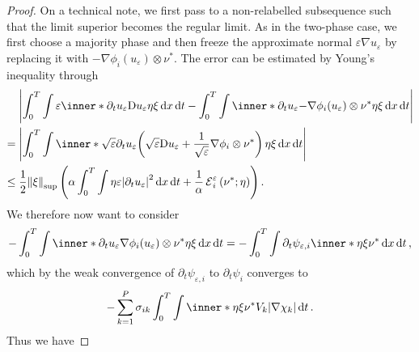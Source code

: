 \begin{proof}
	On a technical note, we first pass to a non-relabelled subsequence such 
	that the limit superior becomes the regular limit.
	As in the two-phase case, we first choose a majority phase and then freeze 
	the approximate normal $ \varepsilon \nabla u_{ \varepsilon } $ by 
	replacing it with $ - \nabla \phi_{ i } ( u_{ \varepsilon } ) \otimes \nu^{ 
	\ast } $. The error can be estimated by Young's inequality through
	\begin{align}
		\notag
		& \abs{
			\int_{ 0 }^{ T }
			\int
			\varepsilon
			\inner*{ \partial_{  t } u_{ 
					\varepsilon } }{ \diff u_{ \varepsilon } \eta \xi }
			\dd{ x }
			\dd{ t }
			-
			\int_{ 0 }^{ T }
			\int
			\inner*{ \partial_{ t } u_{ \varepsilon } }{ - \nabla \phi_{ 
					i } ( u_{ \varepsilon } ) \otimes 
				\nu^{ \ast } \eta\xi }
			\dd{ x }
			\dd{ t }
		}
		\\
		\notag
		={} &
		\abs{
			\int_{ 0 }^{ T }
			\int
			\inner*
			{ 
				\sqrt{ \varepsilon } \partial_{ t } u_{ \varepsilon } }{ 
				\left(
				\sqrt{ \varepsilon } \diff u_{ \varepsilon }
				+
				\frac{ 1 }{ \sqrt{ \varepsilon } }
				\nabla \phi_{ i } \otimes \nu^{ \ast } 
				\right)
				\eta \xi 
			}
			\dd{ x }
			\dd{ t }
		}
		\\
		\label{first_error_for_velocity}
		\leq{} &
		\frac{ 1 }{ 2 }
		\norm{ \xi }_{ \mathrm{sup} }
		\left(
		\alpha 
		\int_{ 0 }^{ T }
		\int
		\eta \varepsilon 
		\abs{ \partial_{ t } u_{ \varepsilon } }^{ 2 }
		\dd{ x }
		\dd{ t }
		+
		\frac{ 1 }{ \alpha }
		\tilt_excess_{ i }^{ \varepsilon } \left( \nu^{ \ast } ; \eta \right)
		\right).
	\end{align}
	We therefore now want to consider
	\begin{equation*}
		- \int_{ 0 }^{ T }
		\int
		\inner*{ \partial_{ t } u_{ \varepsilon } }{ \nabla \phi_{ i } 
			( u_{ \varepsilon } ) \otimes \nu^{ 
				\ast } \eta \xi }
		\dd{ x }
		\dd{ t }
		= 
		- \int_{ 0 }^{ T }
		\int
		\partial_{ t } \psi_{ \varepsilon , i }
		\inner*{ \eta \xi }{ \nu^{ \ast } }
		\dd{ x }
		\dd{ t },
	\end{equation*} 
	which by the weak convergence of $ \partial_{ t } \psi_{ \varepsilon,  i } 
	$ to $ \partial_{ t } \psi_{ i } $ converges to
	\begin{equation*}
		- \sum_{ k = 1  }^{ P }
		\sigma_{ i k }
		\int_{ 0 }^{ T }
		\int
		\inner*{ \eta \xi }{ \nu^{ \ast } }
		V_{ k }
		\abs{ \nabla \chi_{ k } }
		\dd{ t }.
	\end{equation*}
	Thus we have

\end{proof}
